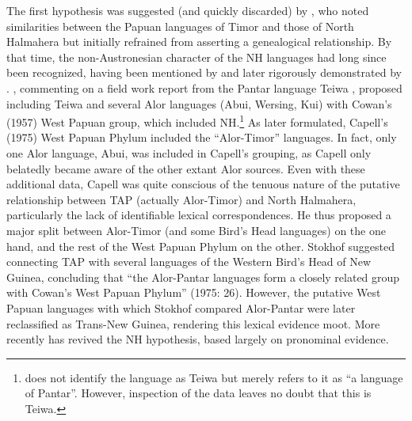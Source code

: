 The first hypothesis was suggested (and quickly discarded) by \citet{Capell1944}, who noted similarities between the Papuan languages of Timor and those of North Halmahera but initially refrained from asserting a genealogical relationship. By that time, the non-Austronesian character of the NH languages had long since been recognized, having been mentioned by \citet{VanDerAaEtAl1872} and later rigorously demonstrated by \citet{VanDerVeen1915}. \citet{Anceaux1973}, commenting on a field work report from the Pantar language Teiwa \citep{Watuseke1973}, proposed including Teiwa and several Alor languages (Abui, Wersing, Kui) with Cowan's (1957) West Papuan group, which included NH.\nocite{Cowan1957}\footnote{\citet{Watuseke1973} does not identify the language as Teiwa but merely refers to it as ``a language of Pantar''. However, inspection of the data leaves no doubt that this is Teiwa.} As later formulated, Capell's (1975) West Papuan Phylum included the ``Alor-Timor'' languages. \nocite{Capell1975} In fact,
only one Alor language, Abui, was included in Capell's grouping, as Capell only belatedly became aware of the other extant Alor sources. Even with these additional data, Capell was quite conscious of the tenuous nature of the putative relationship between TAP (actually Alor-Timor) and North Halmahera, particularly the lack of identifiable lexical correspondences. He thus proposed a major split between Alor-Timor (and some Bird's Head languages) on the one hand, and the rest of the West Papuan Phylum on the other. Stokhof suggested connecting TAP with several languages of the Western Bird's Head of New Guinea, concluding that ``the Alor-Pantar languages form a closely related group with Cowan's West Papuan Phylum'' (1975: 26). However, the putative West Papuan languages with which Stokhof compared Alor-Pantar were later reclassified as Trans-New Guinea, rendering this lexical evidence moot. More recently \citet{Donohue2008boundpron} has revived the NH hypothesis, based largely on pronominal evidence.

